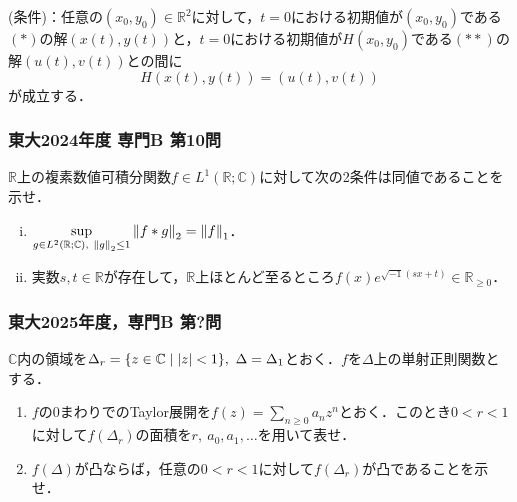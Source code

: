 \documentclass[a4j]{ltjsarticle}
\newcommand{\Rset}{\mathbb{R}}
\newcommand{\Cset}{\mathbb{C}}
\newcommand{\1}{\mathbbm{1}}
\numberwithin{equation}{section}
\theoremstyle{definition}
\begin{document}
(条件)：任意の$(x_0,y_0)\in\Rset^2$に対して，$t=0$における初期値が$(x_0,y_0)$である$(\ast)$の解$(x(t),y(t))$と，$t=0$における初期値が$H(x_0,y_0)$である$(\ast\ast)$の解$(u(t),v(t))$との間に
\begin{equation}
    H(x(t),y(t))=(u(t),v(t))
\end{equation}
が成立する．

\subsubsection*{東大2024年度 専門B 第10問}
$\Rset$上の複素数値可積分関数$f\in L^1(\Rset;\Cset)$に対して次の2条件は同値であることを示せ．
\begin{enumerate}[(i)]
    \item $\displaystyle\sup_{g\in L^2(\Rset;\Cset),\ \norm{g}_{2}\leq 1}\norm{f\ast g}_{2}=\norm{f}_{1}$．
    \item 実数$s,t\in\Rset$が存在して，$\Rset$上ほとんど至るところ$f(x)e^{\sqrt{-1}(sx+t)}\in\Rset_{\geq0}$．
\end{enumerate}

\subsubsection*{東大2025年度，専門B 第?問}
$\Cset$内の領域を$\Delta_r=\qty{z\in\Cset\mid \abs{z}<1},\ \Delta=\Delta_1$とおく．$f$を$\Delta$上の単射正則関数とする．
\begin{enumerate}
    \item $f$の0まわりでのTaylor展開を$f(z)=\sum_{n\geq0}a_nz^n$とおく．このとき$0<r<1$に対して$f(\Delta_r)$の面積を$r,\ a_0,a_1,\ldots$を用いて表せ．
    \item $f(\Delta)$が凸ならば，任意の$0<r<1$に対して$f(\Delta_r)$が凸であることを示せ．
\end{enumerate}
\end{document}
